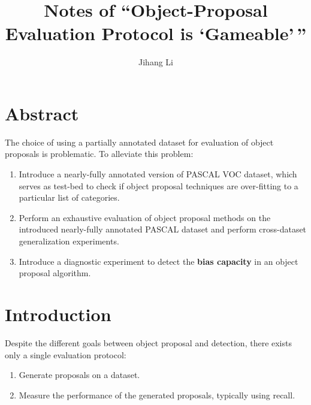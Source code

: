 \documentclass[10pt]{article}
\title{Notes of ``Object-Proposal Evaluation Protocol is `Gameable'\,''}
\author{Jihang Li}
\begin{document}
\maketitle
\tableofcontents

\section*{Abstract}%
\label{sec:abstract}
The choice of using a partially annotated dataset for evaluation of object
proposals is problematic. To alleviate this problem:
%
\begin{enumerate}
  \item Introduce a nearly-fully annotated version of PASCAL VOC dataset, which
    serves as test-bed to check if object proposal techniques are over-fitting
    to a particular list of categories.
  \item Perform an exhaustive evaluation of object proposal methods on the
    introduced nearly-fully annotated PASCAL dataset and perform cross-dataset
    generalization experiments.
  \item Introduce a diagnostic experiment to detect the \textbf{bias capacity}
    in an object proposal algorithm.
\end{enumerate}

\section{Introduction}%
\label{sec:introduction}
Despite the different goals between object proposal and detection, there exists
only a single evaluation protocol:
%
\begin{enumerate}
  \item Generate proposals on a dataset.
  \item Measure the performance of the generated proposals, typically using
    recall.
\end{enumerate}
\end{document}
